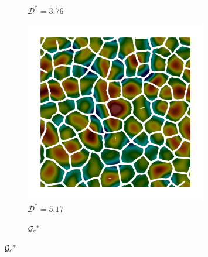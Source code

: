 \begin{figure}[!htbp]
\begin{subfigure}[b]{0.25\textwidth}
    \caption{$\mathcal{D}^* = 3.76$}
    \label{fig: Chapter4/2D/Gc_sqexp_cartesian_5_5_rho_0_seed_a_with_crack_160}
  \end{subfigure}
  \begin{subfigure}[b]{0.25\textwidth}
    \includegraphics[width=\textwidth]{Chapter4/figures/2D/Gc_sqexp_cartesian_5_5_rho_0_seed_a_with_crack_220.png}
    \caption{$\mathcal{D}^* = 5.17$}
    \label{fig: Chapter4/2D/Gc_sqexp_cartesian_5_5_rho_0_seed_a_with_crack_220}
  \end{subfigure}
  \begin{subfigure}[b]{0.08\textwidth}
    \caption*{${\mathcal{G}_c}^*$}

\end{subfigure}
\end{figure}
